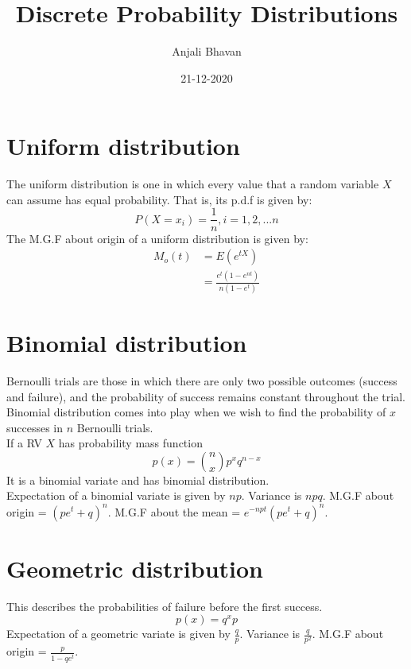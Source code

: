 \documentclass{article}
\title{Discrete Probability Distributions}
\date{21-12-2020}
\author{Anjali Bhavan}
\begin{document}
\maketitle
\section{Uniform distribution}
The uniform distribution is one in which every value that a random variable $ X $ can assume has equal
probability. That is, its p.d.f is given by:
\begin{equation*}
P(X = x_{i}) = \frac{1}{n}, i = 1, 2, ... n
\end{equation*}
The M.G.F about origin of a uniform distribution is given by:
\begin{equation*}
\begin{split}
M_{o}(t) & = E(e^{tX}) \\
  & = \frac{e^{t}(1-e^{nt})}{n(1-e^{t})}
\end{split}
\end{equation*}
\section{Binomial distribution}
Bernoulli trials are those in which there are only two possible outcomes (success and failure), and the probability of success remains constant throughout the trial.
Binomial distribution comes into play when we wish to find the probability of $ x $ successes in $ n $ Bernoulli trials. \\
If a RV $ X $ has probability mass function 
\begin{equation*}
p(x) = \binom{n}{x}p^{x} q^{n-x} 
\end{equation*}
It is a binomial variate and has binomial distribution. \\
Expectation of a binomial variate is given by $ np $. Variance is $ npq $. M.G.F about origin = $ (pe^{t}+q)^{n} $. M.G.F about the mean = $ e^{-npt}(pe^{t}+q)^{n} $.

\section{Geometric distribution}
This describes the probabilities of failure before the first success.
\begin{equation*}
p(x) = q^{x}p
\end{equation*}
Expectation of a geometric variate is given by $ \frac{q}{p} $. Variance is $ \frac{q}{p^{2}} $. M.G.F about origin = $ \frac{p}{1-qe^{t}} $. 
\end{document}
